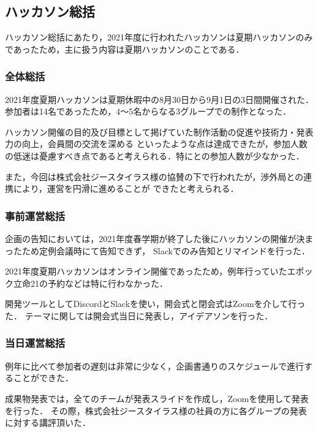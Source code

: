 \subsection*{ハッカソン総括}



ハッカソン総括にあたり，2021年度に行われたハッカソンは夏期ハッカソンのみであったため，主に扱う内容は夏期ハッカソンのことである．

\subsubsection*{全体総括}

2021年度夏期ハッカソンは夏期休暇中の8月30日から9月1日の3日間開催された．参加者は14名であったため，4〜5名からなる3グループでの制作となった．

ハッカソン開催の目的及び目標として掲げていた制作活動の促進や技術力・発表力の向上，会員間の交流を深める
といったような点は達成できたが，参加人数の低迷は憂慮すべき点であると考えられる．特に\firstGrade{}と\secondGrade{}の参加人数が少なかった．

また，今回は株式会社ジースタイラス様の協賛の下で行われたが，渉外局との連携により，運営を円滑に進めることが
できたと考えられる．

\subsubsection*{事前運営総括}

企画の告知においては，2021年度春学期が終了した後にハッカソンの開催が決まったため定例会議時にて告知できず，
Slackでのみ告知とリマインドを行った．

2021年度夏期ハッカソンはオンライン開催であったため，例年行っていたエポック立命21の予約などは特に行わなかった．

開発ツールとしてDiscordとSlackを使い，開会式と閉会式はZoomを介して行った．
テーマに関しては開会式当日に発表し，アイデアソンを行った．

\subsubsection*{当日運営総括}

例年に比べて参加者の遅刻は非常に少なく，企画書通りのスケジュールで進行することができた．

成果物発表では，全てのチームが発表スライドを作成し，Zoomを使用して発表を行った．
その際，株式会社ジースタイラス様の社員の方に各グループの発表に対する講評頂いた．
